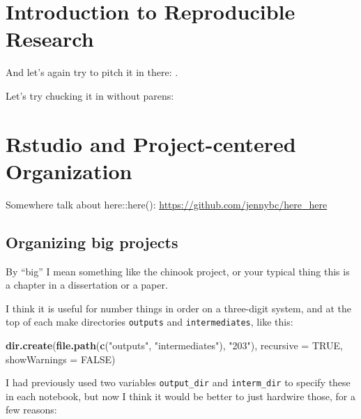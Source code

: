 \documentclass[]{krantz}
\makeatletter
\newenvironment{Shaded}{\begin{snugshade}}{\end{snugshade}}
\newcommand{\DataTypeTok}[1]{\textcolor[rgb]{0.27,0.27,0.27}{#1}}
\newcommand{\KeywordTok}[1]{\textcolor[rgb]{0.27,0.27,0.27}{\textbf{#1}}}
\newcommand{\NormalTok}[1]{#1}
\newcommand{\OtherTok}[1]{\textcolor[rgb]{0.37,0.37,0.37}{#1}}
\newcommand{\StringTok}[1]{\textcolor[rgb]{0.5,0.5,0.5}{#1}}
\newenvironment{kframe}{%
\medskip{}
\setlength{\fboxsep}{.8em}
 \def\at@end@of@kframe{}%
 \ifinner\ifhmode%
  \def\at@end@of@kframe{\end{minipage}}%
  \begin{minipage}{\columnwidth}%
 \fi\fi%
 \def\FrameCommand##1{\hskip\@totalleftmargin \hskip-\fboxsep
 \colorbox{shadecolor}{##1}\hskip-\fboxsep
     \hskip-\linewidth \hskip-\@totalleftmargin \hskip\columnwidth}%
 \MakeFramed {\advance\hsize-\width
   \@totalleftmargin\z@ \linewidth\hsize
   \@setminipage}}%
 {\par\unskip\endMakeFramed%
 \at@end@of@kframe}
\renewenvironment{Shaded}{\begin{kframe}}{\end{kframe}}
\makeatother
\begin{document}
\hypertarget{introduction-to-reproducible-research}{%
\chapter{Introduction to Reproducible Research}\label{introduction-to-reproducible-research}}

\citep{PritchardInferencePopulationStructure2000}

And let's again try to pitch it in there: \citep{PritchardInferencePopulationStructure2000}.

Let's try chucking it in without parens: \citet{PritchardInferencePopulationStructure2000}

\hypertarget{rstudio-and-project-centered-organization}{%
\chapter{Rstudio and Project-centered Organization}\label{rstudio-and-project-centered-organization}}

Somewhere talk about here::here(): \url{https://github.com/jennybc/here_here}

\hypertarget{organizing-big-projects}{%
\section{Organizing big projects}\label{organizing-big-projects}}

By ``big'' I mean something like the chinook project, or your typical thing this is
a chapter in a dissertation or a paper.

I think it is useful for number things in order on a three-digit system, and
at the top of each make directories \texttt{outputs} and \texttt{intermediates}, like this:

\begin{Shaded}
\begin{Highlighting}[]
\KeywordTok{dir.create}\NormalTok{(}\KeywordTok{file.path}\NormalTok{(}\KeywordTok{c}\NormalTok{(}\StringTok{"outputs"}\NormalTok{, }\StringTok{"intermediates"}\NormalTok{), }\StringTok{"203"}\NormalTok{), }\DataTypeTok{recursive =} \OtherTok{TRUE}\NormalTok{, }\DataTypeTok{showWarnings =} \OtherTok{FALSE}\NormalTok{)}
\end{Highlighting}
\end{Shaded}

I had previously used two variables \texttt{output\_dir} and \texttt{interm\_dir} to specify these in each
notebook, but now I think it would be better to just hardwire those, for a few reasons:
\end{document}
